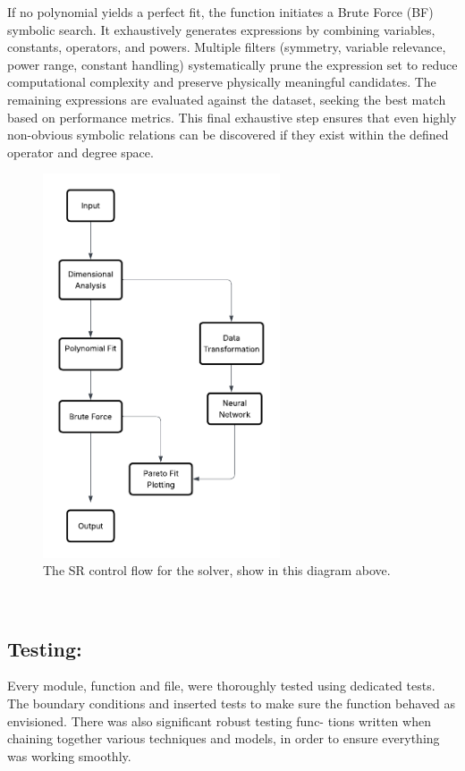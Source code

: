 \documentclass{article}
\begin{document}
If no polynomial yields a perfect fit, the function initiates a Brute Force (BF) symbolic search. It exhaustively generates expressions by combining variables, constants, operators, and powers. Multiple filters (symmetry, variable relevance, power range, constant handling) systematically prune the expression set to reduce computational complexity and preserve physically meaningful candidates. The remaining expressions are evaluated against the dataset, seeking the best match based on performance metrics. This final exhaustive step ensures that even highly non-obvious symbolic relations can be discovered if they exist within the defined operator and degree space.\\


\begin{figure}[H]
    \centering
    \includegraphics[width=7cm]{SR_Flow}
    \caption{The SR control flow for the solver, show in this diagram above.} %
    \label{fig:sr_flow}
\end{figure}\\


\subsection{Testing:}
Every module, function and file, were thoroughly tested using dedicated tests. The boundary conditions and
inserted tests to make sure the function behaved as envisioned. There was also significant robust testing func-
tions written when chaining together various techniques and models, in order to ensure everything was working
smoothly.\\
\end{document}
